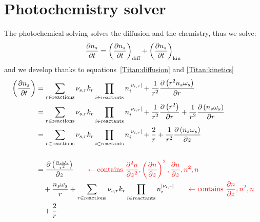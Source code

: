 \section{Photochemistry solver}

The photochemical solving solves the diffusion and the chemistry, thus we solve:
\begin{equation}
\frac{\partial n_s}{\partial t} = \left(\frac{\partial n_s}{\partial t}\right)_\text{diff} + \left(\frac{\partial n_s}{\partial t}\right)_\text{kin}
\end{equation}
and we develop thanks to equations~\ref{Titan:diffusion} and \ref{Titan:kinetics}
\begin{equation}
\begin{split}
\left(\frac{\partial n_s}{\partial t}\right) & = \sum_{r\in \text{reactions}} {\nu_{s,r}}k_{r} \prod_{i\in\text{reactants}}n_i^{|{\nu_{i,r}}|} +
                                     \frac{1}{r^2}\frac{\partial\left(r^2n_s\omega_s\right)}{\partial r} \\
                                 & = \sum_{r\in \text{reactions}} {\nu_{s,r}} k_r\prod_{i\in\text{reactants}}n_i^{|{\nu_{i,r}}|} +
                                     \frac{1}{r^2}\frac{\partial\left(r^2\right)}{\partial r} + \frac{1}{r^2}\frac{\partial\left(n_s\omega_s\right)}{\partial r} \\
                                 & = \sum_{r\in \text{reactions}} {\nu_{s,r}} k_{r}\prod_{i\in\text{reactants}}n_i^{|{\nu_{i,r}}|} +
                                     \frac{2}{r} + \frac{1}{r^2}\frac{\partial\left(n_s\omega_s\right)}{\partial z} \\[\baselineskip]
                                 & = \frac{\partial\left(\frac{n_s\omega_s}{r^2}\right)}{\partial z} 
                                        {\qquad\color{red}\leftarrow \text{contains } 
                                                \frac{\partial^2n}{\partial{z}^2}, \left(\frac{\partial n}{\partial z}\right)^2, \frac{\partial n}{\partial z}, n^2, n}\\
                                 &  \quad + \frac{n_s\omega_s}{r} 
                                          + \sum_{r\in \text{reactions}} {\nu_{s,r}} k_{r}\prod_{i\in\text{reactants}}n_i^{|{\nu_{i,r}}|} 
                                        {\qquad\color{red} \leftarrow \text{contains } \frac{\partial n}{\partial z}, n^2, n}\\
                                 &  \quad + \frac{2}{r}
\end{split}
\end{equation}
